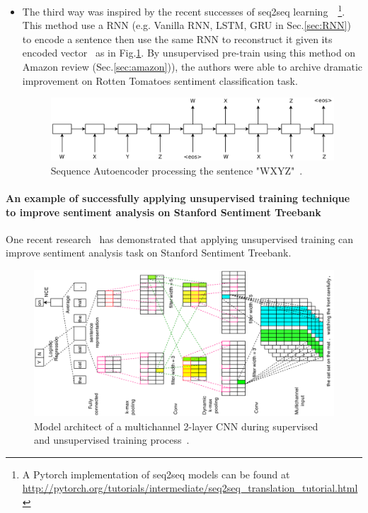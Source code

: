 \begin{itemize}
\item The third way was inspired by the recent successes of seq2seq learning~\cite{SutskeverVL14}~\cite{semisup-seq2seq}\footnote{A Pytorch implementation of seq2seq models can be found at \url{http://pytorch.org/tutorials/intermediate/seq2seq_translation_tutorial.html}}.
This method use a RNN (e.g. Vanilla RNN, LSTM, GRU in Sec.\ref{sec:RNN}) to encode a sentence then use the same RNN to reconstruct it given its encoded vector~\cite{semisup-seq2seq} as in Fig.\ref{fig:rnn-autoencoder}.
By unsupervised pre-train using this method on Amazon review (Sec.\ref{sec:amazon})), the authors were able to archive dramatic improvement on Rotten Tomatoes sentiment classification task.

\begin{figure}[H]
    \centering    \includegraphics[scale=0.43]{figure/rnn-autoencoder}
    \caption[Sequence Autoencoder]{Sequence Autoencoder processing the sentence "WXYZ"~\cite{semisup-seq2seq}.}
    \label{fig:rnn-autoencoder}
\end{figure}

\end{itemize}

\paragraph{An example of successfully applying unsupervised training technique to improve sentiment analysis on Stanford Sentiment Treebank} \label{sec:2-layer-cnn}
One recent research~\cite{2-layer-cnn} has demonstrated that applying unsupervised training can improve sentiment analysis task on Stanford Sentiment Treebank.

\begin{figure}
    \centering    \includegraphics[scale=0.5, angle =-90 ]{figure/2-layer-cnn}
    \caption[2-layer CNN]{Model architect of a multichannel 2-layer CNN during supervised and unsupervised training process~\cite{2-layer-cnn}.}
    \label{fig:2-layer-cnn}
\end{figure}

